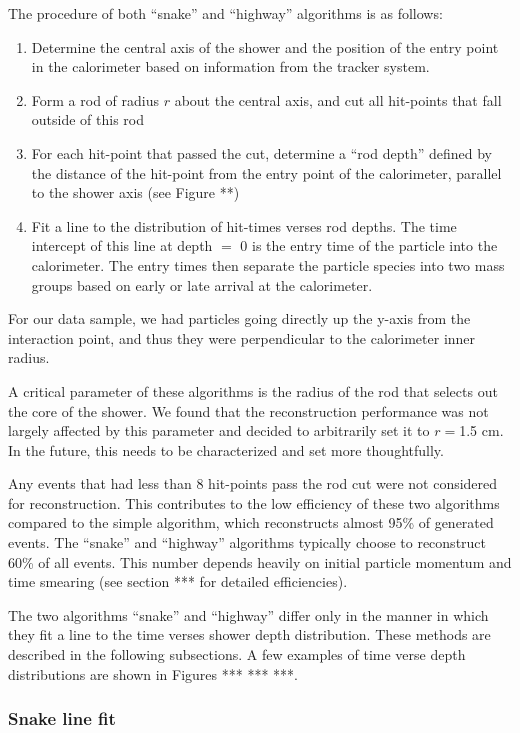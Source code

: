 \documentclass[12pt,twoside,letterpaper]{article}
\begin{document}
The procedure of both ``snake'' and ``highway'' algorithms is as follows:
\begin{enumerate}
\item Determine the central axis of the shower and the position of the entry point in the calorimeter based on information from the tracker system. 
\item Form a rod of radius $r$ about the central axis, and cut all hit-points that fall outside of this rod
\item For each hit-point that passed the cut, determine a ``rod depth'' defined by the distance of the hit-point from the entry point of the calorimeter, parallel to the shower axis (see Figure **)
\item Fit a line to the distribution of hit-times verses rod depths. The time intercept of this line at depth $=$ 0 is the entry time of the particle into the calorimeter. The entry times then separate the particle species into two mass groups based on early or late arrival at the calorimeter. 
\end{enumerate}

For our data sample, we had particles going directly up the y-axis from the interaction point, and thus they were perpendicular to the calorimeter inner radius. 

A critical parameter of these algorithms is the radius of the rod that selects out the core of the shower. We found that the reconstruction performance was not largely affected by this parameter and decided to arbitrarily set it to $r = $1.5 cm. In the future, this needs to be characterized and set more thoughtfully. 

Any events that had less than 8 hit-points pass the rod cut were not considered for reconstruction. This contributes to the low efficiency of these two algorithms compared to the simple algorithm, which reconstructs almost 95\% of generated events. The ``snake'' and ``highway'' algorithms typically choose to reconstruct 60\% of all events. This number depends heavily on initial particle momentum and time smearing (see section *** for detailed efficiencies).

The two algorithms ``snake'' and ``highway'' differ only in the manner in which they fit a line to the time verses shower depth distribution. These methods are described in the following subsections. A few examples of time verse depth distributions are shown in Figures *** *** ***.

\subsubsection{Snake line fit}
\end{document}
